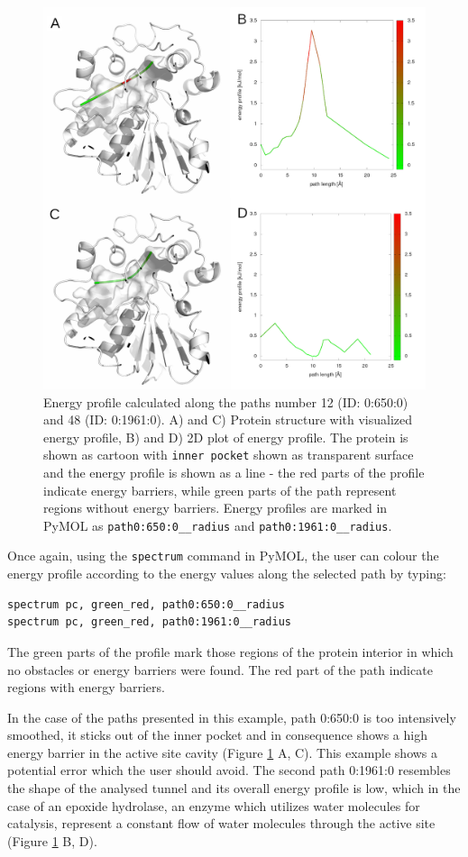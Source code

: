 \documentclass[9pt,tutorial, pubversion]{livecoms}
\begin{document}
\begin{figure}[ht!]
\centering
\includegraphics{Tut4.5.png}
\caption{Energy profile calculated along the paths number 12 (ID: 0:650:0) and 48 (ID: 0:1961:0). A) and C) Protein structure with visualized energy profile, B) and D) 2D plot of energy profile. The protein is shown as cartoon with \texttt{inner pocket} shown as transparent surface and the energy profile is shown as a line - the red parts of the profile indicate energy barriers, while green parts of the path represent regions without energy barriers. Energy profiles are marked in PyMOL as \texttt{path0:650:0\_\_radius} and \texttt{path0:1961:0\_\_radius}.}
\label{Tut4.5}
\end{figure}

Once again, using the \texttt{spectrum} command in PyMOL, the user can colour the energy profile according to the energy values along the selected path by typing:
\begin{lstlisting}
spectrum pc, green_red, path0:650:0__radius
spectrum pc, green_red, path0:1961:0__radius
\end{lstlisting}
The green parts of the profile mark those regions of the protein interior in which no obstacles or energy barriers were found. The red part of the path indicate regions with energy barriers. 

In the case of the paths presented in this example, path 0:650:0 is too intensively smoothed, it sticks out of the inner pocket and in consequence shows a high energy barrier in the active site cavity (Figure \ref{Tut4.5} A, C). This example shows a potential error which the user should avoid. 
The second path 0:1961:0 resembles the shape of the analysed tunnel and its overall energy profile is low, which in the case of an epoxide hydrolase, an enzyme which utilizes water molecules for catalysis, represent a constant flow of water molecules through the active site (Figure \ref{Tut4.5} B, D).
\end{document}
